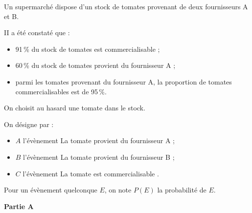 Un supermarché dispose d'un stock de tomates provenant de deux fournisseurs A et B.

II a été constaté que :

\begin{itemize}[label=$\bullet~$]
\item 91\,\% du stock de tomates est commercialisable ;
\item 60\,\% du stock de tomates provient du fournisseur A ;
\item parmi les tomates provenant du fournisseur A, la proportion de tomates commercialisables
est de 95\,\%.
\end{itemize}

On choisit au hasard une tomate dans le stock.

On désigne par :
\begin{itemize}[label=$\bullet~$]
\item $A$ l'évènement \og La tomate provient du fournisseur A \fg ;
\item $B$ l'évènement \og La tomate provient du fournisseur B \fg ;
\item $C$ l'évènement \og La tomate est commercialisable \fg.
\end{itemize}

Pour un évènement quelconque $E$, on note $P(E)$ la probabilité de $E$.

\medskip

\textbf{Partie A}

\medskip


